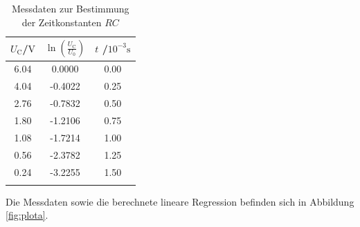\begin{table}
	\caption{Messdaten zur Bestimmung der Zeitkonstanten $RC$}
	\label{tab:taba}
	\centering
	\begin{tabular}{ccc}
		\toprule
		$U_\text{C}$/$\si{\volt}$ & $\ln{(\frac{U_\text{C}}{U_\text{0}})}$ & $t$ /$10^{-3}\si{\second}$ \\
		\midrule
		6.04                      & 0.0000                                 & 0.00                       \\
		4.04                      & -0.4022                                & 0.25                       \\
		2.76                      & -0.7832                                & 0.50                       \\
		1.80                      & -1.2106                                & 0.75                       \\
		1.08                      & -1.7214                                & 1.00                       \\
		0.56                      & -2.3782                                & 1.25                       \\
		0.24                      & -3.2255                                & 1.50                       \\                    \\
		\bottomrule
	\end{tabular}
\end{table}
Die Messdaten sowie die berechnete lineare Regression befinden sich in Abbildung \ref{fig:plota}.
